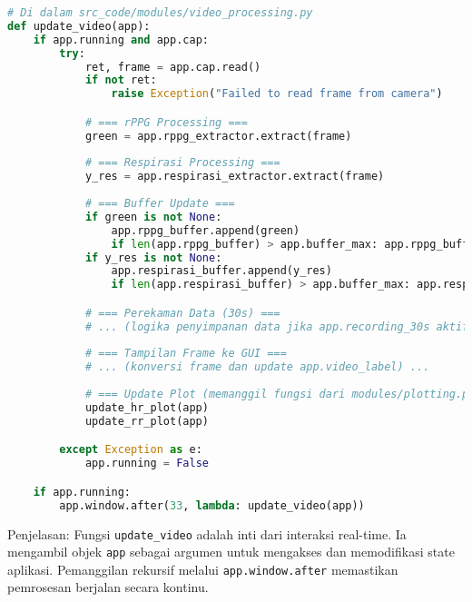 \documentclass[11pt,a4paper]{article}
\begin{document}
\begin{lstlisting}[language=Python, caption=Loop Pemrosesan Video Inti dari \texttt{modules/video\_processing.py}, label={lst:update_video}]
# Di dalam src_code/modules/video_processing.py
def update_video(app):
    if app.running and app.cap:
        try:
            ret, frame = app.cap.read()
            if not ret:
                raise Exception("Failed to read frame from camera")

            # === rPPG Processing ===
            green = app.rppg_extractor.extract(frame)
            
            # === Respirasi Processing ===
            y_res = app.respirasi_extractor.extract(frame)
            
            # === Buffer Update ===
            if green is not None:
                app.rppg_buffer.append(green)
                if len(app.rppg_buffer) > app.buffer_max: app.rppg_buffer.pop(0)
            if y_res is not None:
                app.respirasi_buffer.append(y_res)
                if len(app.respirasi_buffer) > app.buffer_max: app.respirasi_buffer.pop(0)

            # === Perekaman Data (30s) ===
            # ... (logika penyimpanan data jika app.recording_30s aktif) ...
            
            # === Tampilan Frame ke GUI ===
            # ... (konversi frame dan update app.video_label) ...
            
            # === Update Plot (memanggil fungsi dari modules/plotting.py atau langsung) ===
            update_hr_plot(app) 
            update_rr_plot(app) 

        except Exception as e:
            app.running = False

    if app.running:
        app.window.after(33, lambda: update_video(app))
\end{lstlisting}
Penjelasan: Fungsi \texttt{update\_video} adalah inti dari interaksi real-time. Ia mengambil objek \texttt{app} sebagai argumen untuk mengakses dan memodifikasi state aplikasi. Pemanggilan rekursif melalui \texttt{app.window.after} memastikan pemrosesan berjalan secara kontinu.
\end{document}
